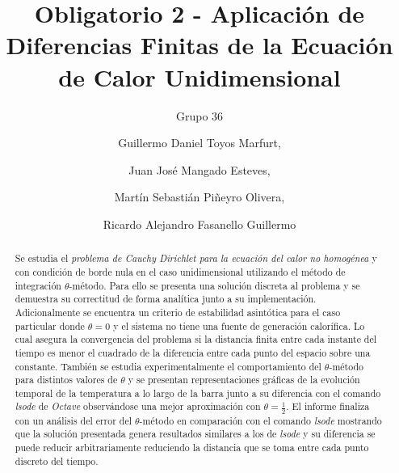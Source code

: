 \documentclass{endm}
\begin{document}
\begin{verbatim}
\end{verbatim}
\vspace{0.6 cm}
\begin{frontmatter}

\title{Obligatorio 2 - Aplicaci\'on de Diferencias Finitas de la Ecuaci\'on de Calor
Unidimensional}

\subtitle{Grupo 36}

\author{Guillermo Daniel Toyos Marfurt,}
\author{Juan Jos\'e Mangado Esteves,}
\author{Martín Sebastián Piñeyro Olivera,}
\author{Ricardo Alejandro Fasanello Guillermo}

\address{Tutor: Juan Piccini}
\address{M\'etodos Num\'ericos 2020\\ Instituto de Matem\'atica y Estad\'istica\\ Facultad de Ingenier\'ia. Universidad de la Rep\'ublica\\ Montevideo, Uruguay}
\begin{abstract}
\setlength{\parindent}{12pt}
Se estudia el \textit{problema de Cauchy Dirichlet  para la ecuación del calor no homogénea} y con condición de borde nula en el caso unidimensional utilizando el método de integración $\theta$-método. Para ello se presenta una solución discreta al problema y se demuestra su correctitud de forma analítica junto a su implementación. Adicionalmente se encuentra un criterio de estabilidad asintótica para el caso particular donde $\theta=0$ y el sistema no tiene una fuente de generación calorífica. Lo cual asegura la convergencia del problema si la distancia finita entre cada instante del tiempo es menor el cuadrado de la diferencia entre cada punto del espacio sobre una constante. También se estudia experimentalmente el comportamiento del $\theta$-método para distintos valores de $\theta$ y se presentan representaciones gráficas de la evolución temporal de la temperatura a lo largo de la barra junto a su diferencia con el comando \textit{lsode} de \textit{Octave} observándose una mejor aproximación con $\theta=\frac{1}{2}$. El informe finaliza con un análisis del error del $\theta$-método en comparación con el comando \textit{lsode} mostrando que la solución presentada genera resultados similares a los de \textit{lsode} y su diferencia se puede reducir arbitrariamente reduciendo la distancia que se toma entre cada punto discreto del tiempo.

\end{abstract}
\end{frontmatter}
\end{document}
